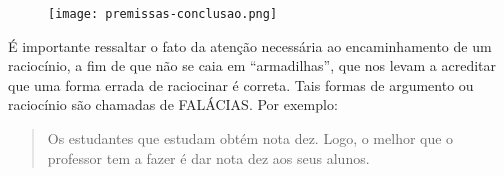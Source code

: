 \begin{figure}[H]
    \texttt{[image: premissas-conclusao.png]}
\end{figure}

É importante ressaltar o fato da atenção necessária ao encaminhamento de um raciocínio, a fim de que não se caia em ``armadilhas'', que nos levam a acreditar que uma forma errada de raciocinar é correta.
Tais formas de argumento ou raciocínio são chamadas de FALÁCIAS.
Por exemplo:

\begin{quote}
    Os estudantes que estudam obtém nota dez. Logo, o melhor que o professor tem a fazer é dar nota dez aos seus alunos.
\end{quote}
